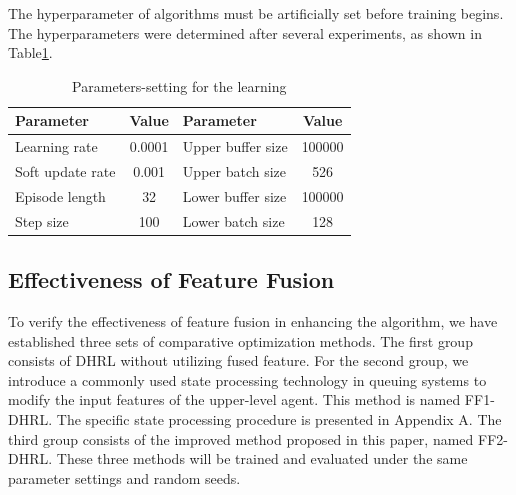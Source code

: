 \documentclass[preprint,12pt]{elsarticle}
\begin{document}
The hyperparameter of algorithms must be artificially set before training
begins. The hyperparameters were determined after several experiments,
as shown in Table\ref{tab:Parameters-learning}. 

\begin{table}[h]
\caption{Parameters-setting for the learning}
\label{tab:Parameters-learning}
\begin{centering}
\begin{tabular}{lclc}
\hline
Parameter & Value & Parameter & Value\tabularnewline
\hline
Learning rate & 0.0001 & Upper buffer size & 100000\tabularnewline
Soft update rate & 0.001 & Upper batch size & 526\tabularnewline
Episode length & 32 & Lower buffer size & 100000\tabularnewline
Step size & 100 & Lower batch size & 128\tabularnewline
\hline
\end{tabular}
\par\end{centering}
\end{table}



\subsection{Effectiveness of Feature Fusion}

To verify the effectiveness of feature fusion in enhancing the algorithm,
we have established three sets of comparative optimization methods.
The first group consists of DHRL without utilizing fused feature.
For the second group, we introduce a commonly used state processing
technology in queuing systems to modify the input features of the
upper-level agent. This method is named FF1-DHRL. The specific state
processing procedure is presented in Appendix A. The third group consists
of the improved method proposed in this paper, named FF2-DHRL. These
three methods will be trained and evaluated under the same parameter
settings and random seeds.
\end{document}
